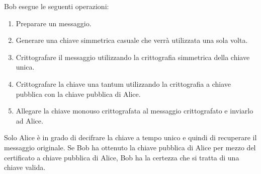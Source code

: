 \singlespacing

Bob esegue le seguenti operazioni:

\begin{enumerate}

    \item Preparare un messaggio.
    
    \item Generare una chiave simmetrica casuale che verrà utilizzata una sola volta.
    
    \item Crittografare il messaggio utilizzando la crittografia simmetrica della chiave unica.
     
    \item Crittografare la chiave una tantum utilizzando la crittografia a chiave pubblica con la chiave pubblica di Alice.
    
    \item Allegare la chiave monouso crittografata al messaggio crittografato e inviarlo ad Alice.
    
\end{enumerate}
Solo Alice è in grado di decifrare la chiave a tempo unico e quindi di recuperare il messaggio originale. Se Bob ha ottenuto la chiave pubblica di Alice per mezzo del certificato a chiave pubblica di Alice, Bob ha la certezza che si tratta di una chiave valida.
